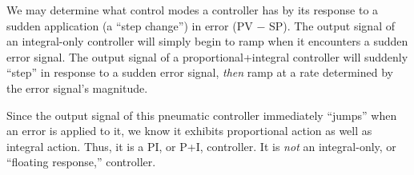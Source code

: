 \vskip 10pt

We may determine what control modes a controller has by its response to a sudden application (a ``step change'') in error (PV $-$ SP).  The output signal of an integral-only controller will simply begin to ramp when it encounters a sudden error signal.  The output signal of a proportional+integral controller will suddenly ``step'' in response to a sudden error signal, {\it then} ramp at a rate determined by the error signal's magnitude.

Since the output signal of this pneumatic controller immediately ``jumps'' when an error is applied to it, we know it exhibits proportional action as well as integral action.  Thus, it is a PI, or P+I, controller.  It is {\it not} an integral-only, or ``floating response,'' controller.




